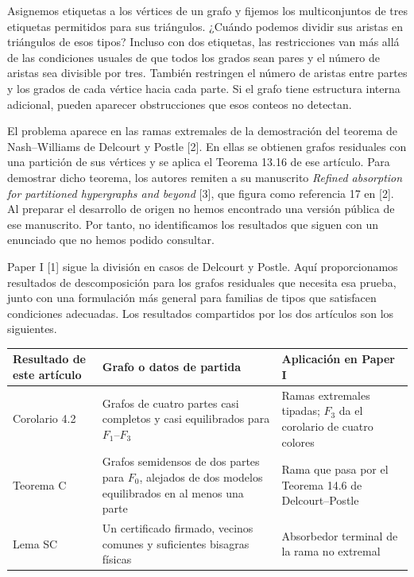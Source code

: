 \documentclass[spanish,11pt,a4paper]{article}
\begin{document}
Asignemos etiquetas a los vértices de un grafo y fijemos los multiconjuntos de tres etiquetas permitidos para sus triángulos. ¿Cuándo podemos dividir sus aristas en triángulos de esos tipos? Incluso con dos etiquetas, las restricciones van más allá de las condiciones usuales de que todos los grados sean pares y el número de aristas sea divisible por tres. También restringen el número de aristas entre partes y los grados de cada vértice hacia cada parte. Si el grafo tiene estructura interna adicional, pueden aparecer obstrucciones que esos conteos no detectan.

El problema aparece en las ramas extremales de la demostración del teorema de Nash--Williams de Delcourt y Postle {[}2{]}. En ellas se obtienen grafos residuales con una partición de sus vértices y se aplica el Teorema 13.16 de ese artículo. Para demostrar dicho teorema, los autores remiten a su manuscrito \emph{Refined absorption for partitioned hypergraphs and beyond} {[}3{]}, que figura como referencia 17 en {[}2{]}. Al preparar el desarrollo de origen no hemos encontrado una versión pública de ese manuscrito. Por tanto, no identificamos los resultados que siguen con un enunciado que no hemos podido consultar.

Paper I {[}1{]} sigue la división en casos de Delcourt y Postle. Aquí proporcionamos resultados de descomposición para los grafos residuales que necesita esa prueba, junto con una formulación más general para familias de tipos que satisfacen condiciones adecuadas. Los resultados compartidos por los dos artículos son los siguientes.

{\begin{longtable}[]{@{}
  >{\raggedright\arraybackslash}p{}
  >{\raggedright\arraybackslash}p{}
  >{\raggedright\arraybackslash}p{}@{}}
\toprule\noalign{}
\begin{minipage}[b]{\linewidth}\raggedright
Resultado de este artículo
\end{minipage} & \begin{minipage}[b]{\linewidth}\raggedright
Grafo o datos de partida
\end{minipage} & \begin{minipage}[b]{\linewidth}\raggedright
Aplicación en Paper I
\end{minipage} \\
\midrule\noalign{}
\endhead
\bottomrule\noalign{}
\endlastfoot
Corolario 4.2 & Grafos de cuatro partes casi completos y casi equilibrados para \(F_1\)--\(F_3\) & Ramas extremales tipadas; \(F_3\) da el corolario de cuatro colores \\
Teorema C & Grafos semidensos de dos partes para \(F_0\), alejados de dos modelos equilibrados en al menos una parte & Rama que pasa por el Teorema 14.6 de Delcourt--Postle \\
Lema SC & Un certificado firmado, vecinos comunes y suficientes bisagras físicas & Absorbedor terminal de la rama no extremal \\
\end{longtable}
}
\end{document}
